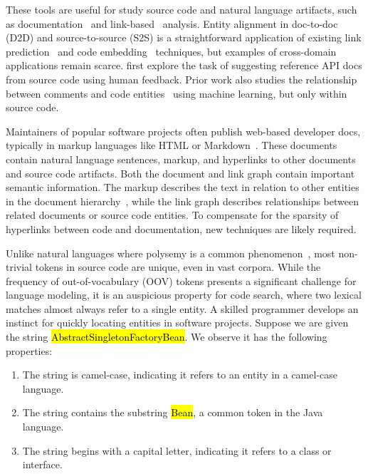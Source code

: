 \documentclass{article}
\newcommand*{\tinline}[1]{{\sethlcolor{slightgray}\ttfamily\footnotesize\relax\hl{#1}}}
\begin{document}
These tools are useful for study source code and natural language artifacts, such as documentation~\citep{yang2016hierarchical} and link-based~\citep{zhang2018link} analysis. Entity alignment in doc-to-doc (D2D) and source-to-source (S2S) is a straightforward application of existing link prediction~\citep{zhang2018link} and code embedding~\citep{gu2018deep} techniques, but examples of cross-domain applications remain scarce. \citet{robillard2015recommending, robillard2017demand} first explore the task of suggesting reference API docs from source code using human feedback. Prior work also studies the relationship between comments and code entities~\citep{iyer2018mapping, panthaplackel2020associating} using machine learning, but only within source code.

Maintainers of popular software projects often publish web-based developer docs, typically in markup languages like HTML or Markdown~\citep{terrasa2018using}. These documents contain natural language sentences, markup, and hyperlinks to other documents and source code artifacts. Both the document and link graph contain important semantic information. The markup describes the text in relation to other entities in the document hierarchy~\citep{yang2016hierarchical}, while the link graph describes relationships between related documents or source code entities. To compensate for the sparsity of hyperlinks between code and documentation, new techniques are likely required.

Unlike natural languages where polysemy is a common phenomenon~\citep{ganea2016probabilistic}, most non-trivial tokens in source code are unique, even in vast corpora. While the frequency of out-of-vocabulary (OOV) tokens presents a significant challenge for language modeling, it is an auspicious property for code search, where two lexical matches almost always refer to a single entity. A skilled programmer develops an instinct for quickly locating entities in software projects. Suppose we are given the string \tinline{AbstractSingletonFactoryBean}. We observe it has the following properties:

\begin{enumerate}
    \item The string is camel-case, indicating it refers to an entity in a camel-case language.
    \item The string contains the substring \tinline{Bean}, a common token in the Java language.
    \item The string begins with a capital letter, indicating it refers to a class or interface.
\end{enumerate}
\end{document}
